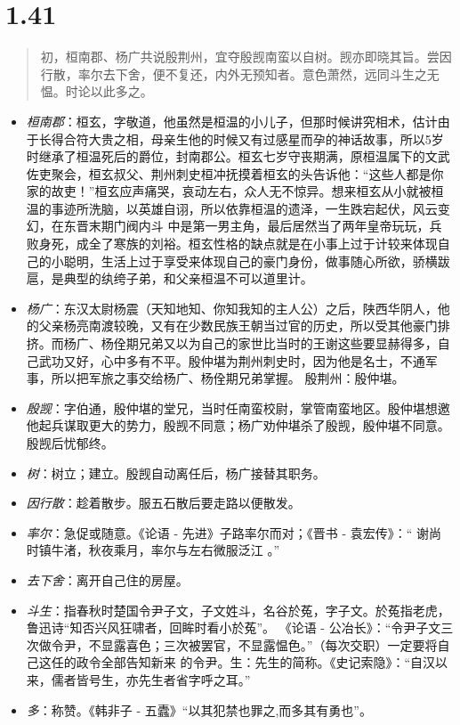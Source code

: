 \documentclass[]{book}
\providecommand{\tightlist}{%
  \setlength{\itemsep}{0pt}\setlength{\parskip}{0pt}}
\begin{document}
\section{1.41}\label{section-40}

\begin{quote}
初，桓南郡、杨广共说殷荆州，宜夺殷觊南蛮以自树。觊亦即晓其旨。尝因行散，率尔去下舍，便不复还，内外无预知者。意色萧然，远同斗生之无愠。时论以此多之。
\end{quote}

\begin{itemize}
\tightlist
\item
  \emph{桓南郡}：桓玄，字敬道，他虽然是桓温的小儿子，但那时候讲究相术，估计由于长得合符大贵之相，母亲生他的时候又有过感星而孕的神话故事，所以5岁时继承了桓温死后的爵位，封南郡公。桓玄七岁守丧期满，原桓温属下的文武佐吏聚会，桓玄叔父、荆州刺史桓冲抚摸着桓玄的头告诉他：``这些人都是你家的故吏！''桓玄应声痛哭，哀动左右，众人无不惊异。想来桓玄从小就被桓温的事迹所洗脑，以英雄自诩，所以依靠桓温的遗泽，一生跌宕起伏，风云变幻，在东晋末期门阀内斗
  中是第一男主角，最后居然当了两年皇帝玩玩，兵败身死，成全了寒族的刘裕。桓玄性格的缺点就是在小事上过于计较来体现自己的小聪明，生活上过于享受来体现自己的豪门身份，做事随心所欲，骄横跋扈，是典型的纨绔子弟，和父亲桓温不可以道里计。
\item
  \emph{杨广}：东汉太尉杨震（天知地知、你知我知的主人公）之后，陕西华阴人，他的父亲杨亮南渡较晚，又有在少数民族王朝当过官的历史，所以受其他豪门排挤。而杨广、杨佺期兄弟又以为自己的家世比当时的王谢这些要显赫得多，自己武功又好，心中多有不平。殷仲堪为荆州刺史时，因为他是名士，不通军事，所以把军旅之事交给杨广、杨佺期兄弟掌握。
  殷荆州：殷仲堪。
\item
  \emph{殷觊}：字伯通，殷仲堪的堂兄，当时任南蛮校尉，掌管南蛮地区。殷仲堪想邀他起兵谋取更大的势力，殷觊不同意；杨广劝仲堪杀了殷觊，殷仲堪不同意。殷觊后忧郁终。
\item
  \emph{树}：树立；建立。殷觊自动离任后，杨广接替其职务。
\item
  \emph{因行散}：趁着散步。服五石散后要走路以便散发。
\item
  \emph{率尔}：急促或随意。《论语 - 先进》子路率尔而对；《晋书 -
  袁宏传》：`` 谢尚时镇牛渚，秋夜乘月，率尔与左右微服泛江 。''
\item
  \emph{去下舍}：离开自己住的房屋。
\item
  \emph{斗生}：指春秋时楚国令尹子文，子文姓斗，名谷於菟，字子文。於菟指老虎，鲁迅诗``知否兴风狂啸者，回眸时看小於菟''。
  《论语 -
  公冶长》：``令尹子文三次做令尹，不显露喜色；三次被罢官，不显露愠色。''（每次交职）一定要将自己这任的政令全部告知新来
  的令尹。生：先生的简称。《史记索隐》：``自汉以来，儒者皆号生，亦先生者省字呼之耳。''
\item
  \emph{多}：称赞。《韩非子 - 五蠹》``以其犯禁也罪之,而多其有勇也''。
\end{itemize}
\end{document}
